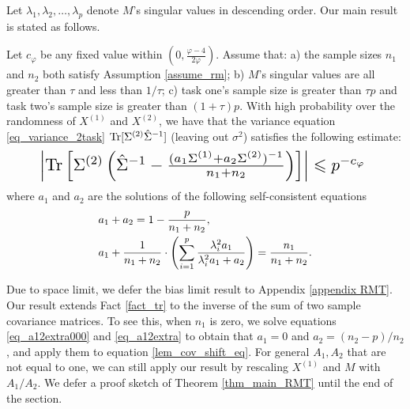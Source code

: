 Let $\lambda_1, \lambda_2, \dots, \lambda_p$ denote $M$'s singular values in descending order.
Our main result is stated as follows.

\begin{theorem}\label{thm_main_RMT}
	Let $c_{\varphi}$ be any fixed value within $(0, \frac{\varphi - 4}{2\varphi})$.
	Assume that: a) the sample sizes $n_1$ and $n_2$ both satisfy Assumption \ref{assume_rm};
	b) $M$'s singular values are all greater than $\tau$ and less than $1/\tau$;
	c) task one's sample size is greater than $\tau p$ and task two's sample size is greater than $(1 + \tau) p$.
	With high probability over the randomness of $X^{(1)}$ and $X^{(2)}$, we have that
	the variance equation \eqref{eq_variance_2task} $\operatorname{Tr}[\Sigma^{(2)} \hat{\Sigma}^{-1}]$ (leaving out $\sigma^2$) satisfies the following estimate:
			\begin{align}\label{lem_cov_shift_eq}
				\resizebox{0.869\hsize}{!}{%
				$\bigabs{\bigtr{\Sigma^{(2)} \bigbrace{ {\hat{\Sigma}^{-1}} - \frac{(a_1 \Sigma^{(1)} + a_2 \Sigma^{(2)})^{-1}}{n_1+n_2} }}}
				\le p^{-c_{\varphi}}$
				}%
			\end{align}
			where $a_1$ and $a_2$ are the solutions of the following self-consistent equations
			\begin{align}
				&a_1 + a_2 = 1- \frac{p}{n_1 + n_2},\label{eq_a12extra000}\\
				&a_1 + \frac1{n_1 + n_2}\cdot \left({\sum_{i=1}^p \frac{\lambda_i^2 a_1}{\lambda_i^2 a_1 + a_2}}\right) = \frac{n_1}{n_1 + n_2}. \label{eq_a12extra}
			\end{align}
\end{theorem}
Due to space limit, we defer the bias limit result to Appendix \eqref{appendix RMT}.
Our result extends Fact \ref{fact_tr} to the inverse of the sum of two sample covariance matrices.
To see this, when $n_1$ is zero, we solve equations \eqref{eq_a12extra000} and  \eqref{eq_a12extra} to obtain that $a_1 = 0$ and $a_2 = (n_2-p) / n_2$, and apply them to equation \eqref{lem_cov_shift_eq}.
For general $A_1,A_2$ that are not equal to one, we can still apply our result by rescaling $X^{(1)}$ and $M$ with $A_1 / A_2$.
We defer a proof sketch of Theorem \ref{thm_main_RMT} until the end of the section.

